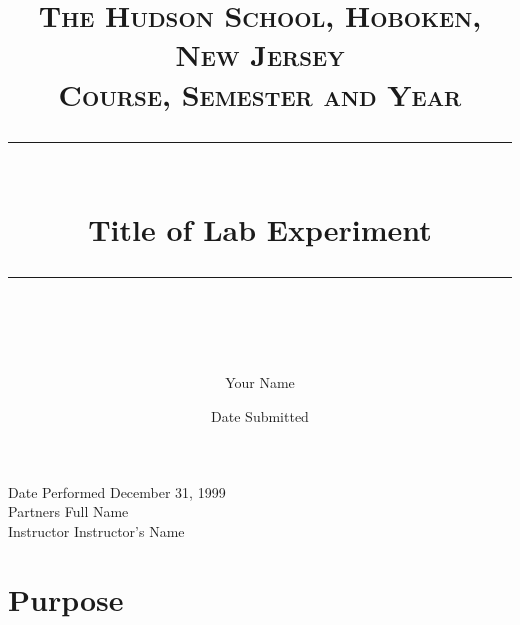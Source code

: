 \documentclass{article} %
\title{
\normalfont \normalsize 
\textsc{The Hudson School, Hoboken, New Jersey \\ 
Course, Semester and Year} \\
[10pt] 
\rule{\linewidth}{0.5pt} \\[6pt] 
\huge Title of Lab Experiment \\
\rule{\linewidth}{2pt}  \\[10pt]
}
\author{Your Name}
\date{\normalsize Date Submitted}
\begin{document}
\maketitle
\noindent
Date Performed \dotfill December 31, 1999 \\
Partners \dotfill Full Name \\
Instructor \dotfill Instructor's Name \\



%
%
%
%





\section{Purpose}
 




\end{document}
